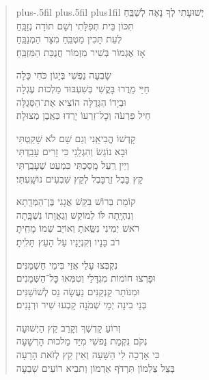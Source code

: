 \documentclass[twoside, openany, parskip=half, 11pt]{book}
\begin{document}
\begin{quote}
\leftskip=0pt plus-.5fil
\rightskip=0pt plus.5fil
\parfillskip=0pt plus1fil
יְשׁוּעָתִי \hfill לְךָ נָאֶה לְשַׁבֵּֽחַ \\ תִּכּוֹן בֵּית תְּפִלָּתִי \hfill וְשָׁם תּוֹדָה נְזַבֵּֽחַ \\
לְעֵת תָּכִין מַטְבֵּֽחַ \hfill מִצָּר הַמְנַבֵּֽחַ \\ אָז אֶגְמוֹר בְּשִׁיר מִזְמוֹר \hfill חֲנֻכַּת הַמִּזְבֵּֽחַ׃

שָׂבְעָה נַפְשִׁי \hfill בְּיָגוֹן כֹּחִי כָּלָה \\ חַיַּי מֵרֲרוּ בָּקֳשִׁי \hfill בְּשִׁעְבּוּד מַלְכוּת עֶגְלָה \\
וּבְיָדוֹ הַגְּדֻלָּה \hfill הוֹצִיא אֶת־הַסְּגֻלָּה \\ חֵיל פַּרְעֹה וְכׇל־זַרְעוֹ \hfill יָרְדוּ כְּאֶֽבֶן מְצוּלָה׃

קָדְשׁוֹ הֱבִיאַֽנִי \hfill וְגַם שָׁם לֹא שָׁקַֽטְתִּי \\ וּבָא נוֹגֵשׂ וְהִגְלַֽנִי \hfill כִּי זָרִים עָבַֽדְתִּי \\
וְיֵין רַֽעַל מָֽסַכְתִּי \hfill כִּמְעַט שֶׁעָבַֽרְתִּי \\ קֵץ בָּבֶל זְרֻבָּבֶל \hfill לְקֵץ שִׁבְעִים נוֹשָֽׁעְתִּי׃

קוֹמַת בְּרוֹשׁ בִּקֵּשׁ \hfill אֲגָגִי בֶּן־הַמְּדָֽתָא \\ וְנִהְיָֽתָה לּוֹ לְמוֹקֵשׁ \hfill וְגַאֲוָתוֹ נִשְׁבָּֽתָה \\
רֹאשׁ יְמִינִי נִשֵּֽׂאתָ \hfill וְאוֹיֵב שְׁמוֹ מָחִֽיתָ \\ רֹב בָּנָיו וְקִנְיָנָיו \hfill עַל הָעֵץ תָּלִֽיתָ׃

נִקְבְּצוּ עָלַי \hfill אֲזַי בִּימֵי חַשְׁמַנִּים \\ וּפָרְצוּ חוֹמוֹת מִגְדָּלַי \hfill וְטִמְּאוּ כׇּל־הַשְּׁמָנִים \\
וּמִנּוֹתַר קַנְקַנִּים \hfill נַעֲשָׂה נֵס לְשׁוֹשַׁנִּים \\ בְּנֵי בִינָה יְמֵי שְׁמֹנָה \hfill קָבְעוּ שִׁיר וּרְנָנִים׃


זְרוֹעַ קָדְשֶׁךָ \hfill וְקָרֵב קֵץ הַיְשׁוּעָה\\
נְקֹם נִקְמַת נַפשִׁי \hfill מִיַּד מַלכוּת הָרְשָׁעָה\\
כִּי אָרְכָה לִי הַשָּׁעָה \hfill וְאֵין קֵץ לְזׂאת הָרָעָה\\
בְּצֵל צַלְמוֹן תִּרְדּׂף אַדְמוֹן \hfill וְתבִיא רוֹעִים שִׁבְעָה

\end{quote}
\end{document}

